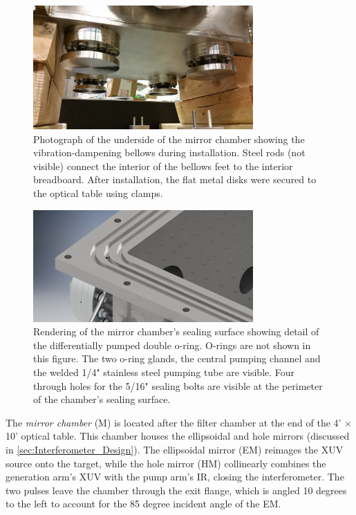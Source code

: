 \begin{figure}
	\centering
	\includegraphics[width=0.75\textwidth]{figures/chap2/mirror_chamber-bellows_feet_lowres.jpg}
	\caption{Photograph of the underside of the mirror chamber showing the vibration-dampening bellows during installation. Steel rods (not visible) connect the interior of the bellows feet to the interior breadboard. After installation, the flat metal disks were secured to the optical table using clamps.}
	\label{fig:mirror_chamber_bellows_feet}
\end{figure}

\begin{figure}
	\centering
	\includegraphics[width=0.75\textwidth]{figures/chap2/mirror_chamber-diff_pump_groove.png}
	\caption{Rendering of the mirror chamber's sealing surface showing detail of the differentially pumped double o-ring. O-rings are not shown in this figure. The two o-ring glands, the central pumping channel and the welded 1/4" stainless steel pumping tube are visible. Four through holes for the 5/16" sealing bolts are visible at the perimeter of the chamber's sealing surface.}
	\label{fig:mirror_chamber_diff_pump_groove}
\end{figure}

The \textit{mirror chamber} (M) is located after the filter chamber at the end of the 4' $\times$ 10' optical table. This chamber houses the ellipsoidal and hole mirrors (discussed in \cref{sec:Interferometer_Design}). The ellipsoidal mirror (EM) reimages the XUV source onto the target, while the hole mirror (HM) collinearly combines the generation arm's XUV with the pump arm's IR, closing the interferometer. The two pulses leave the chamber through the exit flange, which is angled 10 degrees to the left to account for the 85 degree incident angle of the EM.

